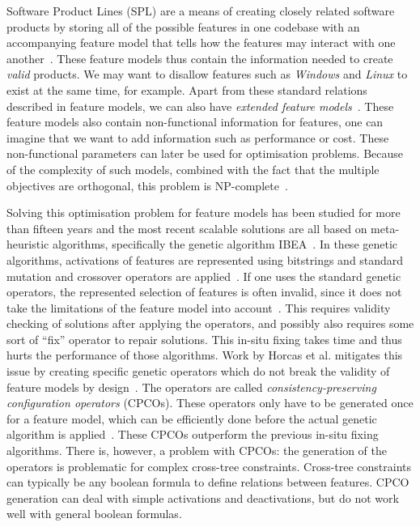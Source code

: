 Software Product Lines (SPL) are a means of creating closely related software
products by storing all of the possible features in one codebase with an
accompanying feature model that tells how the features may interact with one
another~\cite{apel2016spl, kang1990fms}. These feature models thus contain the
information needed to create \emph{valid} products. We may want to disallow
features such as \emph{Windows} and \emph{Linux} to exist at the same time, for
example. Apart from these standard relations described in feature models, we
can also have \emph{extended feature models}~\cite{benavides2005extfms}. These
feature models also contain non-functional information for features, one can
imagine that we want to add information such as performance or cost. These
non-functional parameters can later be used for optimisation problems. Because
of the complexity of such models, combined with the fact that the multiple
objectives are orthogonal, this problem is 
NP-complete~\cite{ochoa2018npcomplete}. 

Solving this optimisation problem for feature models has been studied for more
than fifteen years and the most recent scalable solutions are all based on
meta-heuristic algorithms, specifically the genetic algorithm
IBEA~\cite{horcas2022breakit, zitzler2004ibea}. In these genetic algorithms,
activations of features are represented using bitstrings and standard mutation
and crossover operators are applied~\cite{ochoa2018npcomplete}. If one uses the
standard genetic operators, the represented selection of features is often
invalid, since it does not take the limitations of the feature model into
account~\cite{henard2015satibea, pascual2015modagame}. This requires validity
checking of solutions after applying the operators, and possibly also requires
some sort of ``fix'' operator to repair solutions. This in-situ fixing takes
time and thus hurts the performance of those algorithms. Work by Horcas et al.
mitigates this issue by creating specific genetic operators which do not break
the validity of feature models by design~\cite{horcas2022breakit}. The
operators are called \emph{consistency-preserving configuration operators}
(CPCOs). These operators only have to be generated once for a feature model,
which can be efficiently done before the actual genetic algorithm is
applied~\cite{horcas2022breakit}. These CPCOs outperform the previous in-situ
fixing algorithms. There is, however, a problem with CPCOs: the generation of
the operators is problematic for complex cross-tree constraints. Cross-tree 
constraints can typically be any boolean formula to define relations between
features. CPCO generation can deal with simple activations and deactivations,
but do not work well with general boolean formulas.

